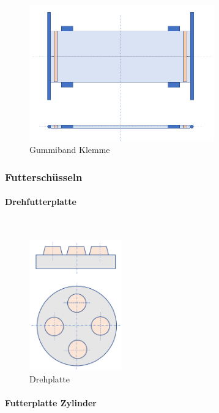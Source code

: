 \documentclass[a4paper,12pt]{scrartcl}
\begin{document}
\begin{figure}[H]
\begin{center}
\includegraphics[width=8cm]{Bilder/Powerpoint/Gummiband_Klemme}
\caption{Gummiband Klemme}
\end{center}
\end{figure}
\newpage
\subsubsection{Futterschüsseln}

\paragraph{Drehfutterplatte}$~~$\\ 

\begin{figure}[H]
\begin{center}
\includegraphics[width=4cm]{Bilder/Powerpoint/Drehplatte}
\caption{Drehplatte}
\end{center}
\end{figure}

\paragraph{Futterplatte Zylinder}$~~$\\ 
\end{document}
